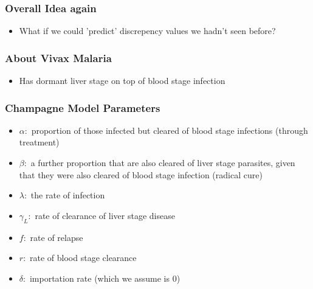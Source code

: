 \documentclass{beamer}
\begin{document}
\begin{frame}
    \frametitle{Overall Idea again}
    \begin{itemize}
        \item What if we could 'predict' discrepency values we hadn't seen before?
    \end{itemize}
\end{frame}

\begin{frame}
    \frametitle{About Vivax Malaria}
    \begin{itemize}
        \item Has dormant liver stage on top of blood stage infection
    \end{itemize}
\end{frame}

\begin{frame}
    \frametitle{Champagne Model Parameters}\begin{itemize}
        \item $\alpha:$ proportion of those infected but cleared of blood stage infections (through treatment)
        \item $\beta:$ a further proportion that are also cleared of liver stage parasites, given that they were also cleared of blood stage infection (radical cure)
        \item $\lambda:$ the rate of infection
        \item $\gamma_L:$ rate of clearance of liver stage disease
        \item $f:$ rate of relapse
        \item $r:$ rate of blood stage clearance
        \item $\delta:$ importation rate (which we assume is 0)
    \end{itemize}

\end{frame}
\end{document}
